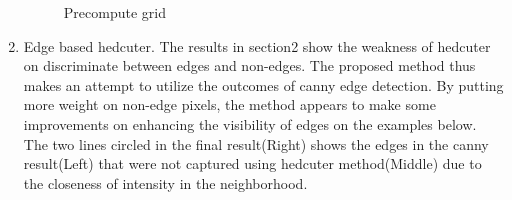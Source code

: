\documentclass[11pt]{article}
\begin{document}
\begin{enumerate}
  \begin{figure}[h!]
      \centering
      \qquad
      \qquad
      \caption{Precompute grid}
      \label{fig:Liang-precompute}
  \end{figure}
  \newpage
  \item Edge based hedcuter. The results in section2 show the weakness of hedcuter on discriminate between edges and non-edges. The proposed method thus makes an attempt to utilize the outcomes of canny edge detection. By putting more weight on non-edge pixels, the method appears to make some improvements on enhancing the visibility of edges on the examples below. The two lines circled in the final result(Right) shows the edges in the canny result(Left) that were not captured using hedcuter method(Middle) due to the closeness of intensity in the neighborhood.

\end{enumerate}
\end{document}
